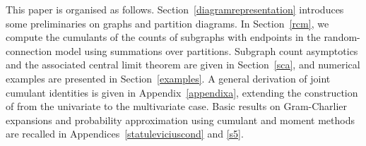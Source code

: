 \documentclass[12pt]{article}
\numberwithin{equation}{section}
\begin{document}


\medskip 

This paper is organised as follows.
 Section~\ref{diagramrepresentation} introduces some
preliminaries on graphs and partition diagrams.
In Section~\ref{rcm}, we compute the cumulants
 of the counts of subgraphs with endpoints in the random-connection
model using summations over partitions. 
Subgraph count asymptotics and the associated
central limit theorem are given 
in Section~\ref{sca}, and numerical examples are
presented in Section~\ref{examples}.
A general derivation of joint cumulant identities is given 
in Appendix~\ref{appendixa}, extending the construction of
 \cite{LiuPrivault} from the univariate to the multivariate case. 
 Basic results on Gram-Charlier expansions and probability approximation
 using cumulant and moment methods are recalled in 
Appendices~\ref{statuleviciuscond} and \ref{s5}. 

%
%
%
\end{document}
